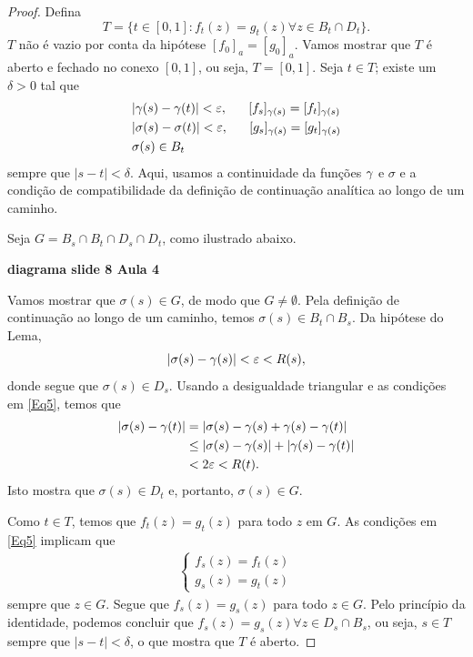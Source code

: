 \begin{proof}
        Defina
        \begin{equation*}
        T = \{t \in [0,1]: f_t(z) = g_t(z) \forall z \in B_t \cap D_t\}.
        \end{equation*}
        $T$ não é vazio por conta da hipótese $[f_0]_a = [g_0]_a$. Vamos mostrar que $T$ é
        aberto e fechado no conexo $[0,1]$, ou seja, $T = [0,1]$. Seja $t \in T$; 
        existe um $\delta > 0$ tal que
        \begin{align}
        \label{Eq5}
            &|\y(s) - \y(t)| < \e, \ \ \ \ \ [f_s]_{\y(s)} =
            [f_t]_{\y(s)} \\
            &|\sigma(s) - \sigma(t)| < \e, \ \ \ \ \ [g_s]_{\y(s)} =
            [g_t]_{\y(s)} \\
            &\sigma(s) \in B_t
        \end{align}
        sempre que $|s-t|<\delta$. Aqui, usamos a continuidade da funções $\gamma$ e $\sigma$ 
        e a condição de compatibilidade da definição de continuação analítica ao longo de um
        caminho.
        
        Seja $G = B_s \cap B_t \cap D_s \cap D_t$, como ilustrado abaixo. 
        \begin{center}
            \textbf{diagrama slide 8 Aula 4}
        \end{center}
        Vamos mostrar que 
        $\sigma(s) \in G$, de modo que $G \neq \emptyset$. Pela definição de continuação 
        ao longo de um caminho, temos $\sigma(s) \in B_t \cap B_s$. Da hipótese do Lema,
        \begin{equation*}
        |\sigma(s) - \gamma(s)| < \varepsilon < R(s),
        \end{equation*}
        donde segue que $\sigma(s) \in D_s$. Usando a desigualdade triangular e as condições em \ref{Eq5}, temos que
        \begin{align*}
        |\sigma(s) - \gamma(t)| &= |\sigma(s) - \gamma(s) + \gamma(s) - \gamma(t)| \\
        &\leq |\sigma(s) - \gamma(s)| + |\gamma(s) - \gamma(t)| \\
        &< 2\varepsilon < R(t).
        \end{align*}
        Isto mostra que $\sigma(s) \in D_t$ e, portanto, $\sigma(s) \in G$.
        
        Como $t \in T$, temos que $f_t(z) = g_t(z)$ para todo $z$ em $G$. 
        As condições em \ref{Eq5} implicam que 
        \begin{align*}
            \begin{cases}
                f_s(z) = f_t(z) \\
                g_s(z) = g_t(z)
            \end{cases}
        \end{align*}
        sempre que $z \in G$. Segue que $f_s(z) = g_s(z)$ para todo $z \in G$. 
        Pelo princípio da identidade, podemos concluir que 
        $f_s(z) = g_s(z) \forall z \in D_s \cap B_s$, ou seja, $s \in T$ sempre que 
        $|s-t|< \delta$, o que mostra que $T$ é aberto.
        

\end{proof}
